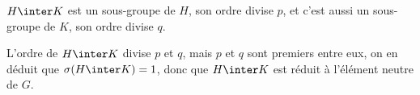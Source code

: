 $H \inter K$ est un sous-groupe de $H$, son ordre divise $p$, et c'est aussi un sous-groupe de $K$, son ordre divise $q$.

L'ordre de $H \inter K$ divise $p$ et $q$, mais $p$ et $q$ sont premiers entre eux, on en déduit que $\sigma(H \inter K) = 1$, donc que $H \inter K$ est réduit à l'élément neutre de $G$.